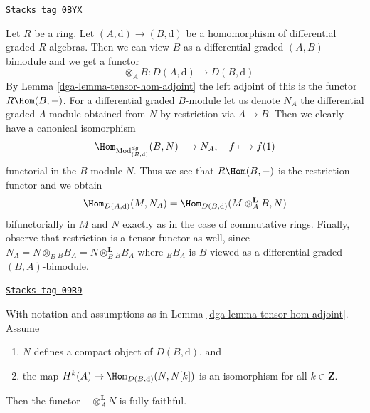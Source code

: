 \begin{example}
\label{dga-example-map-hom-tensor}
\href{https://stacks.math.columbia.edu/tag/0BYX}{\texttt{Stacks tag 0BYX}}

Let $R$ be a ring. Let $(A, \text{d}) \to (B, \text{d})$ be a
homomorphism of differential graded $R$-algebras. Then we can
view $B$ as a differential graded $(A, B)$-bimodule and we get a functor
$$
- \otimes_A B : D(A, \text{d}) \longrightarrow D(B, \text{d})
$$
By Lemma \ref{dga-lemma-tensor-hom-adjoint} the left adjoint of this
is the functor $R\Hom(B, -)$. For a differential graded $B$-module
let us denote $N_A$ the differential graded $A$-module obtained
from $N$ by restriction via $A \to B$. Then we clearly have
a canonical isomorphism
$$
\Hom_{\text{Mod}^{dg}_{(B, \text{d})}}(B, N) \longrightarrow N_A,\quad
f \longmapsto f(1)
$$
functorial in the $B$-module $N$. Thus we see that
$R\Hom(B, -)$ is the restriction functor and we obtain
$$
\Hom_{D(A, \text{d})}(M, N_A) =
\Hom_{D(B, \text{d})}(M \otimes^\mathbf{L}_A B, N)
$$
bifunctorially in $M$ and $N$ exactly as in the case of commutative rings.
Finally, observe that restriction is a tensor functor as well,
since $N_A = N \otimes_B {}_BB_A = N \otimes_B^\mathbf{L} {}_BB_A$
where ${}_BB_A$ is $B$ viewed as a differential graded $(B, A)$-bimodule.
\end{example}

\begin{lemma}
\label{dga-lemma-tensor-with-compact-fully-faithful}
\href{https://stacks.math.columbia.edu/tag/09R9}{\texttt{Stacks tag 09R9}}

With notation and assumptions as in Lemma \ref{dga-lemma-tensor-hom-adjoint}.
Assume
\begin{enumerate}
\item $N$ defines a compact object of $D(B, \text{d})$, and
\item the map $H^k(A) \to \Hom_{D(B, \text{d})}(N, N[k])$ is an
isomorphism for all $k \in \mathbf{Z}$.
\end{enumerate}
Then the functor $-\otimes_A^\mathbf{L} N$ is fully faithful.
\end{lemma}

